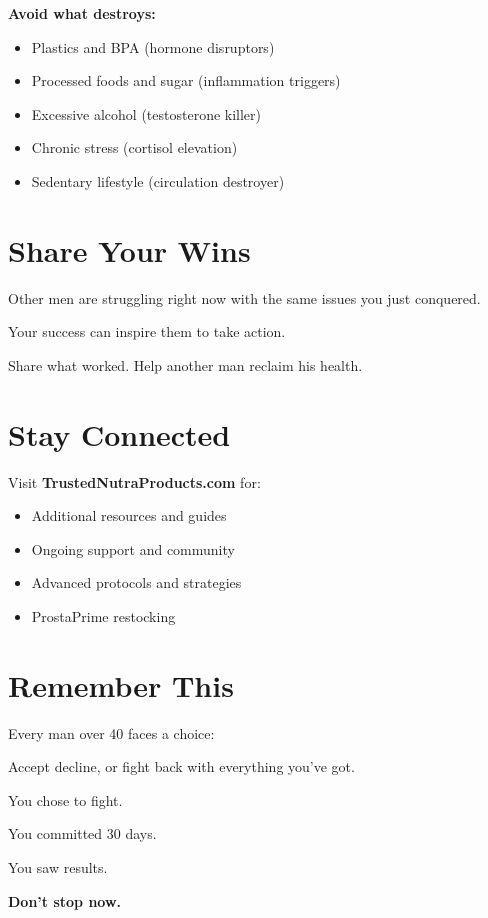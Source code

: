 \documentclass[11pt,oneside]{book}
\begin{document}
\textbf{Avoid what destroys:}
\begin{itemize}[leftmargin=*]
\item Plastics and BPA (hormone disruptors)
\item Processed foods and sugar (inflammation triggers)
\item Excessive alcohol (testosterone killer)
\item Chronic stress (cortisol elevation)
\item Sedentary lifestyle (circulation destroyer)
\end{itemize}

\section*{Share Your Wins}

Other men are struggling right now with the same issues you just conquered.

Your success can inspire them to take action.

Share what worked. Help another man reclaim his health.

\section*{Stay Connected}

Visit \textbf{TrustedNutraProducts.com} for:
\begin{itemize}[leftmargin=*]
\item Additional resources and guides
\item Ongoing support and community
\item Advanced protocols and strategies
\item ProstaPrime restocking
\end{itemize}

\section*{Remember This}

Every man over 40 faces a choice:

Accept decline, or fight back with everything you've got.

You chose to fight.

You committed 30 days.

You saw results.

\textbf{Don't stop now.}

\vspace{1cm}
\end{document}
